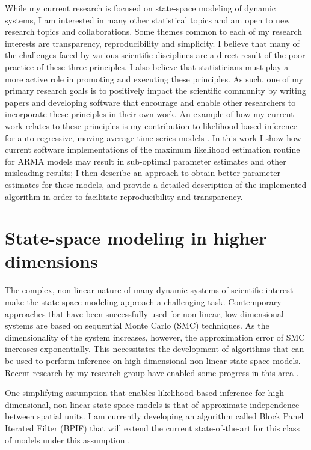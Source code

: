 \documentclass{article}
\begin{document}
While my current research is focused on state-space modeling of dynamic systems, I am interested in many other statistical topics and am open to new research topics and collaborations.
Some themes common to each of my research interests are transparency, reproducibility and simplicity.
I believe that many of the challenges faced by various scientific disciplines are a direct result of the poor practice of these three principles.
I also believe that statisticians must play a more active role in promoting and executing these principles.
As such, one of my primary research goals is to positively impact the scientific community by writing papers and developing software that encourage and enable other researchers to incorporate these principles in their own work.
An example of how my current work relates to these principles is my contribution to likelihood based inference for auto-regressive, moving-average time series models \cite{wheeler2023-a}.
In this work I show how current software implementations of the maximum likelihood estimation routine for ARMA models may result in sub-optimal parameter estimates and other misleading results; I then describe an approach to obtain better parameter estimates for these models, and provide a detailed description of the implemented algorithm in order to facilitate reproducibility and transparency.

\section{State-space modeling in higher dimensions}\label{sec:methods}

The complex, non-linear nature of many dynamic systems of scientific interest make the state-space modeling approach a challenging task.
Contemporary approaches that have been successfully used for non-linear, low-dimensional systems are based on sequential Monte Carlo (SMC) techniques.
As the dimensionality of the system increases, however, the approximation error of SMC increases exponentially.
This necessitates the development of algorithms that can be used to perform inference on high-dimensional non-linear state-space models.
Recent research by my research group have enabled some progress in this area \cite{ionides22}.

One simplifying assumption that enables likelihood based inference for high-dimensional, non-linear state-space models is that of approximate independence between spatial units.
I am currently developing an algorithm called Block Panel Iterated Filter (BPIF) that will extend the current state-of-the-art for this class of models under this assumption \cite{wheeler2023-b}.
\end{document}
